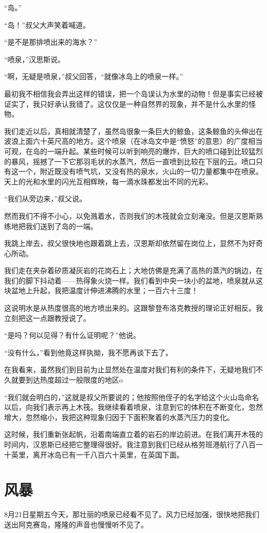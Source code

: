 \documentclass[10pt]{book}
\begin{document}
“岛。”

“岛！”叔父大声笑着喊道。

“是不是那排喷出来的海水？”

“喷泉，”汉思斯说。

“啊，无疑是喷泉，”叔父回答，“就像冰岛上的喷泉一样。”

最初我不相信我会弄出这样的错误，把一个岛误认为水里的动物！但是事实已经被证实了，我只好承认我错了。这仅仅是一种自然界的现象，并不是什么水里的怪物。

我们走近以后，真相就清楚了，虽然岛很象一条巨大的鲸鱼，这条鲸鱼的头伸出在波浪上面六十英尺高的地方。这个喷泉（在冰岛文中是“愤怒”的意思）的广度相当可观，在岛的一端升起。某些时候可以听到响亮的爆炸，巨大的喷口碰到比较猛烈的暴风，摇撼了一下它那羽毛状的水蒸汽，然后一直喷到比较在下层的云。喷口只有这一个，附近既没有喷气坑，又没有热的泉水，火山的一切力量都集中在喷泉。天上的光和水里的闪光互相辉映，每一滴水珠都发出不同的光彩。

“我们从旁边来，”叔父说。

然而我们不得不小心，以免溅着水，否则我们的木筏就会立刻淹没。但是汉恩斯熟练地把我们送到了岛的一端。

我跳上岸去，叔父很快地也跟着跳上去，汉恩斯却依然留在岗位上，显然不为好奇心所动。

我们走在夹杂着矽质凝灰岩的花岗石上；大地仿佛是充满了高热的蒸汽的锅边，在我们的脚下抖动着——热得象火烧一样。我们看到中央一块小的盆地，喷泉就从这块盆地上升起，我把温度计伸进沸腾的水里；一百六十三度！

这说明水是从热度很高的地方喷出来的。这跟黎登布洛克教授的理论正好相反。我立刻把这一点跟教授说了。

“是吗？何以见得？有什么证明呢？”他说。

“没有什么，”看到他竟这样执拗，我不愿再谈下去了。

在我看来，虽然我们到目前为止显然处在温度对我们有利的条件下，无疑地我们不久就要到达热度超过一般限度的地区o

“我们就会明白的，”这就是叔父所要说的；他按照他侄子的名字给这个火山岛命名以后，向我们表示再上木筏。我继续看着喷泉，注意到它的体积在不断变化，忽然增大，忽然缩小，我把这种现象归因于下面积聚着的水蒸汽压力的变化。

这时候，我们重新张起帆，沿着南端直立着的岩石的岸边前进。在我们离开木筏的时间内，汉恩斯已经把它整理得很好。我注意到我们已经从格劳班港航行了八百一十英里，离开冰岛已有一千八百六十英里，在英国下面。
\chapter{风暴}
8月21日星期五今天，那壮丽的喷泉已经看不见了。风力已经加强，很快地把我们送出阿克赛岛，隆隆的声音也慢慢听不见了。
\end{document}
